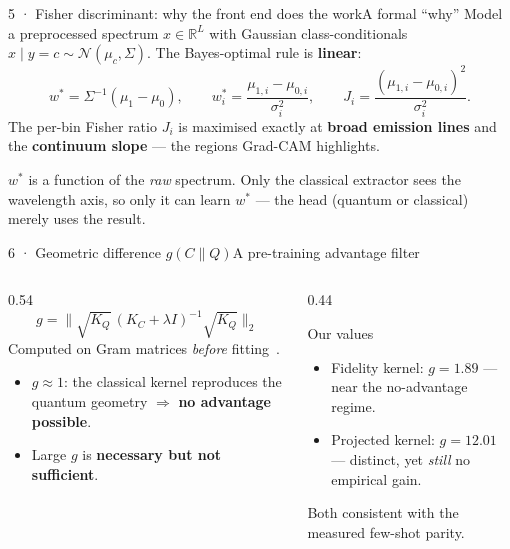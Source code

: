 \begin{frame}{5 · Fisher discriminant: why the front end does the work}{A formal ``why''}
    Model a preprocessed spectrum $x\in\mathbb{R}^L$ with Gaussian class-conditionals
    $x\mid y{=}c \sim \mathcal{N}(\mu_c,\Sigma)$. The Bayes-optimal rule is
    \textbf{linear}:
    \[
        w^\ast=\Sigma^{-1}(\mu_1-\mu_0),\qquad
        w^\ast_i=\frac{\mu_{1,i}-\mu_{0,i}}{\sigma_i^2},\qquad
        J_i=\frac{(\mu_{1,i}-\mu_{0,i})^2}{\sigma_i^2}.
    \]
    The per-bin Fisher ratio $J_i$ is maximised exactly at \textbf{broad emission
        lines} and the \textbf{continuum slope} --- the regions Grad-CAM highlights.
    \begin{callout}
        $w^\ast$ is a function of the \emph{raw} spectrum. Only the classical
        extractor sees the wavelength axis, so only it can learn $w^\ast$ --- the
        head (quantum or classical) merely uses the result.
    \end{callout}
\end{frame}

\begin{frame}{6 · Geometric difference $g(C\|Q)$}{A pre-training advantage filter}
    \begin{columns}[T]
        \begin{column}{0.54\textwidth}
            \[
                g=\big\|\sqrt{K_Q}\,(K_C+\lambda I)^{-1}\sqrt{K_Q}\big\|_2
            \]
            Computed on Gram matrices \emph{before} fitting~\cite{huang2021power}.
            \begin{itemize}
                \item $g\approx 1$: the classical kernel reproduces the quantum
                      geometry $\Rightarrow$ \textbf{no advantage possible}.
                \item Large $g$ is \textbf{necessary but not sufficient}.
            \end{itemize}
        \end{column}
        \begin{column}{0.44\textwidth}
            \begin{block}{Our values}
                \begin{itemize}
                    \item Fidelity kernel: $g=1.89$ --- near the no-advantage regime.
                    \item Projected kernel: $g=12.01$ --- distinct, yet \emph{still}
                          no empirical gain.
                \end{itemize}
            \end{block}
            \footnotesize Both consistent with the measured few-shot parity.
        \end{column}
    \end{columns}
\end{frame}

